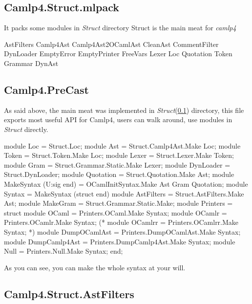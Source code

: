 \subsection{Camlp4.Struct.mlpack}
\label{Camlp4.Struct}
It packs some modules in \textit{Struct} directory
Struct is the main meat for \textit{camlp4}

\begin{bashcode}
AstFilters
Camlp4Ast
Camlp4Ast2OCamlAst
CleanAst
CommentFilter
DynLoader
EmptyError
EmptyPrinter
FreeVars
Lexer
Loc
Quotation
Token
Grammar
DynAst
\end{bashcode}


\subsection{Camlp4.PreCast}

As said above, the main meat was implemented in
\textit{Struct}(\ref{Camlp4.Struct}) directory, this file exports most
useful API for Camlp4, users can walk around, use modules in
\textit{Struct} directly.

\begin{ocamlcode}
  module Loc = Struct.Loc;
  module Ast = Struct.Camlp4Ast.Make Loc;
  module Token = Struct.Token.Make Loc;
  module Lexer = Struct.Lexer.Make Token;
  module Gram = Struct.Grammar.Static.Make Lexer;
  module DynLoader = Struct.DynLoader;
  module Quotation = Struct.Quotation.Make Ast;
  module MakeSyntax (U:sig end) =
    OCamlInitSyntax.Make Ast Gram Quotation;
  module Syntax = MakeSyntax (struct end)
  module AstFilters = Struct.AstFilters.Make Ast;
  module MakeGram = Struct.Grammar.Static.Make;
  module Printers = struct
    module OCaml = Printers.OCaml.Make Syntax;
    module OCamlr = Printers.OCamlr.Make Syntax;
    (* module OCamlrr = Printers.OCamlrr.Make Syntax; *)
    module DumpOCamlAst = Printers.DumpOCamlAst.Make Syntax;
    module DumpCamlp4Ast = Printers.DumpCamlp4Ast.Make Syntax;
    module Null = Printers.Null.Make Syntax;
  end;
\end{ocamlcode}

As you can see, you can make the whole syntax at your will.

\subsection{Camlp4.Struct.AstFilters}
\label{Camlp4.Struct.AstFilters}


